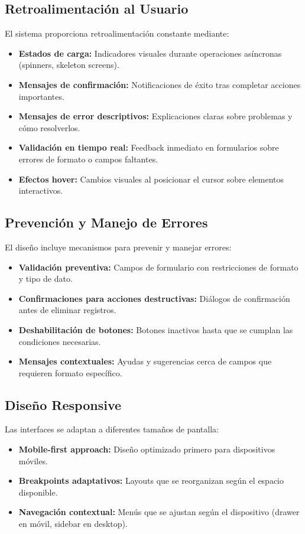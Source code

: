 \subsection{Retroalimentación al Usuario}
El sistema proporciona retroalimentación constante mediante:
\begin{itemize}
    \item \textbf{Estados de carga:} Indicadores visuales durante operaciones asíncronas (spinners, skeleton screens).
    \item \textbf{Mensajes de confirmación:} Notificaciones de éxito tras completar acciones importantes.
    \item \textbf{Mensajes de error descriptivos:} Explicaciones claras sobre problemas y cómo resolverlos.
    \item \textbf{Validación en tiempo real:} Feedback inmediato en formularios sobre errores de formato o campos faltantes.
    \item \textbf{Efectos hover:} Cambios visuales al posicionar el cursor sobre elementos interactivos.
\end{itemize}


\subsection{Prevención y Manejo de Errores}
El diseño incluye mecanismos para prevenir y manejar errores:
\begin{itemize}
    \item \textbf{Validación preventiva:} Campos de formulario con restricciones de formato y tipo de dato.
    \item \textbf{Confirmaciones para acciones destructivas:} Diálogos de confirmación antes de eliminar registros.
    \item \textbf{Deshabilitación de botones:} Botones inactivos hasta que se cumplan las condiciones necesarias.
    \item \textbf{Mensajes contextuales:} Ayudas y sugerencias cerca de campos que requieren formato específico.
\end{itemize}


\subsection{Diseño Responsive}
Las interfaces se adaptan a diferentes tamaños de pantalla:
\begin{itemize}
    \item \textbf{Mobile-first approach:} Diseño optimizado primero para dispositivos móviles.
    \item \textbf{Breakpoints adaptativos:} Layouts que se reorganizan según el espacio disponible.
    \item \textbf{Navegación contextual:} Menús que se ajustan según el dispositivo (drawer en móvil, sidebar en desktop).
\end{itemize}


